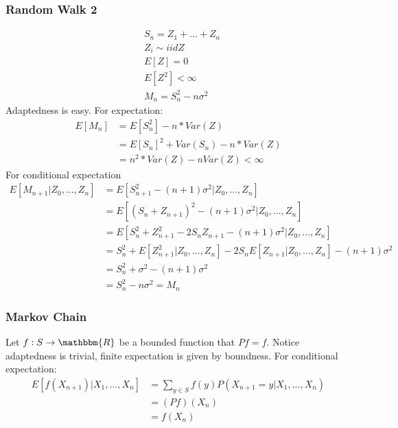 \subsubsection{Random Walk 2} 
    \begin{align*}
        & S_n = Z_1 + ... + Z_n \\
        & Z_i \sim iid Z\\
        & E[Z] = 0 \\
        & E[Z^2] < \infty \\
        & M_n = S_n^2 - n\sigma^2
    \end{align*}
Adaptedness is easy. For expectation: 
    \begin{align*}
        E[M_n]
        & = E[S_n^2] - n * Var(Z) \\
        & = E[S_n]^2 + Var(S_n) - n * Var(Z) \\
        & = n^2 * Var(Z) - n Var(Z) < \infty
    \end{align*}
For conditional expectation 
    \begin{align*}
        E[M_{n+1} | Z_0, ..., Z_n]
        & = E[S_{n+1}^2 - (n+1) \sigma^2 | Z_0, ..., Z_n] \\
        & = E[(S_n + Z_{n+1})^2 - (n+1) \sigma^2 | Z_0, ..., Z_n] \\
        & = E[S_n^2 + Z_{n+1}^2 - 2 S_n Z_{n+1} - (n+1) \sigma^2 | Z_0, ..., Z_n]\\
        & = S_n^2 + E[Z_{n+1}^2 | Z_0, ..., Z_n] - 2 S_n E[Z_{n+1}|Z_0, ..., Z_n] - (n+1)\sigma^2 \\
        & = S_n^2 + \sigma^2 - (n+1)\sigma^2 \\
        & = S_n^2 - n\sigma^2 = M_{n}
    \end{align*}

\subsubsection{Markov Chain}
Let $f:S \to \mathbbm{R}$ be a bounded function that $Pf = f$. Notice adaptedness is trivial, finite expectation is given by boundness. For conditional expectation: 
    \begin{align*}
        E[f(X_{n+1}) | X_1, ..., X_n]
        & = \sum_{y\in S} f(y) P(X_{n+1}=y | X_1, ..., X_n) \tag{Notice the probability is the $(X_n, y)$ entry in $P$} \\
        & = (Pf)(X_n) \tag{Entry associated with $X_n$ in vector $Pf$} \\
        & = f(X_n)
    \end{align*}


